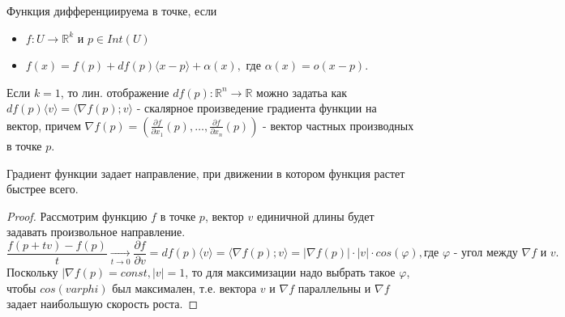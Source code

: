 \begin{definition}
    Функция дифференциируема в точке, если 
    \begin{itemize}
        \item $f:U \to \mathbb{R}^k$ и $p \in Int(U)$
        \item $f(x) = f(p) + df(p)\langle x-p \rangle + \alpha(x),$ где $\alpha(x) = o(x-p).$
    \end{itemize}
\end{definition}
Если $k = 1$, то лин. отображение $df(p):\mathbb{R}^n \to \mathbb{R}$
можно задатьа как $df(p)\langle v \rangle = \langle \nabla f(p);  v \rangle$
 - скалярное произведение градиента функции на вектор, причем 
 $\nabla f(p) = \left(\frac{\partial f}{\partial x_1}(p), \dots, \frac{\partial f}{\partial x_n}(p)\right)$ - вектор частных производных в точке $p$.

\begin{statement}
    Градиент функции задает направление, при движении в котором функция растет быстрее всего.
    \begin{proof}
        Рассмотрим функцию $f$ в точке $p$, вектор $v$ единичной длины будет задавать произвольное направление.
        \begin{equation*}\frac{f(p+tv) - f(p)}{t} \underset{t \to 0}{\to}
            \frac{\partial f}{\partial v} = df(p)\langle v \rangle = \langle \nabla f(p); v \rangle 
            = |\nabla f(p)| \cdot |v| \cdot cos(\varphi), \text{где $\varphi $ - угол между $\nabla f$ и $v$.}
        \end{equation*}
        Поскольку $|\nabla f(p) = const, |v| = 1$, то для максимизации надо выбрать такое $\varphi$, 
        чтобы $cos(varphi)$ был максимален, т.е. вектора $v$ и $\nabla f$ параллельны и $\nabla f$ задает наибольшую скорость роста.
    \end{proof}
\end{statement}

